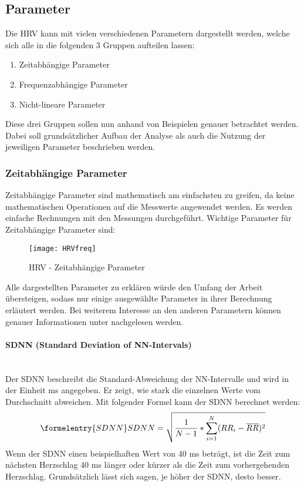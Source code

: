  \subsection{Parameter}
 
 Die HRV kann mit vielen verschiedenen Parametern dargestellt werden, welche sich alle in die folgenden 3 Gruppen aufteilen lassen:
 
 \begin{enumerate}
 	\item Zeitabhängige Parameter
 	\item Frequenzabhängige Parameter
 	\item Nicht-lineare Parameter
\end{enumerate}

Diese drei Gruppen sollen nun anhand von Beispielen genauer betrachtet werden. Dabei soll grundsätzlicher Aufbau der Analyse als auch die Nutzung der jeweiligen Parameter beschrieben werden.

\subsubsection{Zeitabhängige Parameter}	
Zeitabhängige Parameter sind mathematisch am einfachsten zu greifen, da keine mathematischen Operationen auf die Messwerte angewendet werden. Es werden einfache Rechnungen mit den Messungen durchgeführt. Wichtige Parameter für Zeitabhängige Parameter sind:   
 
 \begin{figure}[H]
 	\centering
 	\texttt{[image: HRVfreq]}
 	\caption{HRV - Zeitabhängige Parameter}
 	\label{fig:HRVfreq}
 	\cite[S.2]{med}
 \end{figure}
Alle dargestellten Parameter zu erklären würde den Umfang der Arbeit übersteigen, sodass nur einige ausgewählte Parameter in ihrer Berechnung erläutert werden. Bei weiterem Interesse an den anderen Parametern können genauer Informationen unter \cite{med} nachgelesen werden. 

\paragraph{SDNN (Standard Deviation of NN-Intervals)}\mbox{} \\
Der SDNN beschreibt die Standard-Abweichung der NN-Intervalle und wird in der Einheit ms angegeben. Er zeigt, wie stark die einzelnen Werte vom Durchschnitt abweichen. Mit folgender Formel kann der SDNN berechnet werden: 
\begin{equation}\formelentry{SDNN}
SDNN = \sqrt{\dfrac{1}{N-1} * \sum\limits_{i=1}^{N}  (RR_i - \overline{RR})^{2}}
\end{equation}
Wenn der SDNN einen beispielhaften Wert von 40 ms beträgt, ist die Zeit zum nächsten Herzschlag 40 ms länger oder kürzer als die Zeit zum vorhergehenden Herzschlag. Grundsätzlich lässt sich sagen, je höher der SDNN, desto besser.\\

